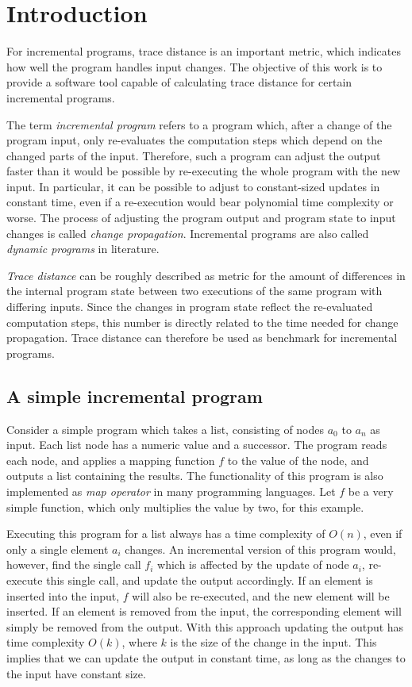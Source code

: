 
\chapter{Introduction}
\label{ch:Introduction}

For incremental programs, trace distance is an important metric, which indicates how well the program handles input changes. The objective of this work is to provide a software tool capable of calculating trace distance for certain incremental programs.  

The term \textit{incremental program} refers to a program which, after a change of the program input, only re-evaluates the computation steps which depend on the changed parts of the input. Therefore, such a program can adjust the output faster than it would be possible by re-executing the whole program with the new input. In particular, it can be possible to adjust to constant-sized updates in constant time, even if a re-execution would bear polynomial time complexity or worse. The process of adjusting the program output and program state to input changes is called \textit{change propagation}. Incremental programs are also called \textit{dynamic programs} in literature. 

\textit{Trace distance} can be roughly described as metric for the amount of differences in the internal program state between two executions of the same program with differing inputs. Since the changes in program state reflect the re-evaluated computation steps, this number is directly related to the time needed for change propagation. Trace distance can therefore be used as benchmark for incremental programs. 

\section{A simple incremental program}
\label{sec:simple_example}
Consider a simple program which takes a list, consisting of nodes $a_0$ to $a_n$ as input. Each list node has a numeric value and a successor. The program reads each node, and applies a mapping function $f$ to the value of the node, and outputs a list containing the results. The functionality of this program is also implemented as \textit{map operator} in many programming languages. Let $f$ be a very simple function, which only multiplies the value by two, for this example. 

Executing this program for a list always has a time complexity of $O(n)$, even if only a single element $a_i$ changes. An incremental version of this program would, however, find the single call $f_i$ which is affected by the update of node $a_i$, re-execute this single call, and update the output accordingly. If an element is inserted into the input, $f$ will also be re-executed, and the new element will be inserted. If an element is removed from the input, the corresponding element will simply be removed from the output. With this approach updating the output has time complexity $O(k)$, where $k$ is the size of the change in the input. This implies that we can update the output in constant time, as long as the changes to the input have constant size. 

